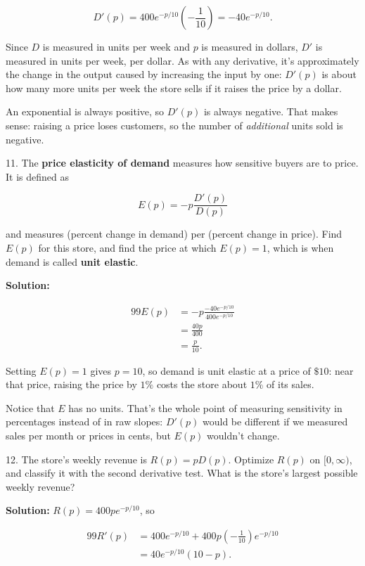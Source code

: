 \documentclass{article}
\begin{document}
$$
	D'(p) = 400e^{-p/10} \left( -\frac{1}{10} \right) = -40e^{-p/10}.
$$

Since $D$ is measured in units per week and $p$ is measured in dollars, $D'$ is measured in units per week, per dollar. As with any derivative, it's approximately the change in the output caused by increasing the input by one: $D'(p)$ is about how many more units per week the store sells if it raises the price by a dollar.

An exponential is always positive, so $D'(p)$ is always negative. That makes sense: raising a price loses customers, so the number of \textit{additional} units sold is negative.

11. The \textbf{price elasticity of demand} measures how sensitive buyers are to price. It is defined as

$$
	E(p) = -p\frac{D'(p)}{D(p)}
$$

and measures (percent change in demand) per (percent change in price). Find $E(p)$ for this store, and find the price at which $E(p) = 1$, which is when demand is called \textbf{unit elastic}.

\textbf{Solution:}

\begin{alignat*}{99}
	E(p) &= -p \frac{-40e^{-p/10}}{400e^{-p/10}}\\
	&= \frac{40p}{400}\\
	&= \frac{p}{10}.
\end{alignat*}

Setting $E(p) = 1$ gives $p = 10$, so demand is unit elastic at a price of $\$10$: near that price, raising the price by $1\%$ costs the store about $1\%$ of its sales.

Notice that $E$ has no units. That's the whole point of measuring sensitivity in percentages instead of in raw slopes: $D'(p)$ would be different if we measured sales per month or prices in cents, but $E(p)$ wouldn't change.

12. The store's weekly revenue is $R(p) = pD(p)$. Optimize $R(p)$ on $[0, \infty)$, and classify it with the second derivative test. What is the store's largest possible weekly revenue?

\textbf{Solution:} $R(p) = 400pe^{-p/10}$, so

\begin{alignat*}{99}
	R'(p) &= 400e^{-p/10} + 400p \left( -\frac{1}{10} \right) e^{-p/10}\\
	&= 40e^{-p/10}(10 - p).
\end{alignat*}
\end{document}
